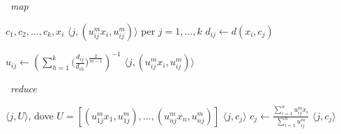 \documentclass{beamer}
\begin{document}
\begin{frame}
    \begin{algorithm}[H]
        \caption{\fcm\ \textit{map}}
        \begin{algorithmic}[1]
            \Require $c_1, c_2, \ldots, c_k, x_i$
            \Ensure $\big\langle j, (u_{ij}^{m} x_i, u_{ij}^{m}) \big\rangle $ per $j = 1, \ldots, k$
            \State $d_{ij} \leftarrow d(x_i, c_j)$
            \EndFor

            \State $u_{ij} \leftarrow \left(\sum_{h=1}^{k} \Big(\frac{d_{ij}}{d_{ih}}\Big)^{\frac{2}{m-1}}\right)^{-1} $
            \State \Return $\big\langle j, (u_{ij}^{m}x_i, u_{ij}^{m}) \big\rangle $
            \EndFor
        \end{algorithmic}
    \end{algorithm}
\end{frame}


\begin{frame}
    \begin{algorithm}[H]
        \caption{\fcm\ \textit{reduce}}
        \begin{algorithmic}[1]
            \Require $\big\langle j, U \big\rangle $, dove $U = [(u_{1j}^{m} x_1, u_{1j}^{m}), \ldots, (u_{nj}^{m}x_n, u_{nj}^{m})]$
            \Ensure $\big\langle j, c_j \big\rangle $
            \State $c_j \leftarrow \frac{\sum_{i=1}^{n} u_{ij}^{m}x_i}{\sum_{i=1}^{n} u_{ij}^{m}} $
            \State\Return $\big\langle j, c_j \big\rangle $
        \end{algorithmic}
    \end{algorithm}
\end{frame}

\end{document}
